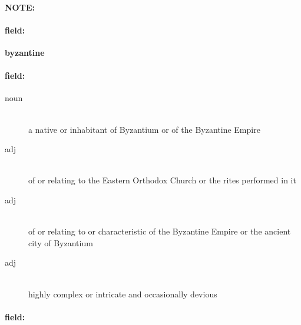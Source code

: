 \documentclass[12pt]{article}
\newenvironment{note}{\paragraph{NOTE:}}{}
\newenvironment{field}{\paragraph{field:}}{}
\begin{document}
\begin{note}
\begin{field}
\textbf{\large byzantine}
\end{field}


\begin{field}
\begin{description}
\item[noun] \hfill \\ 
a native or inhabitant of Byzantium or of the Byzantine Empire

\item[adj] \hfill \\ 
of or relating to the Eastern Orthodox Church or the rites performed in it

\item[adj] \hfill \\ 
of or relating to or characteristic of the Byzantine Empire or the ancient city of Byzantium

\item[adj] \hfill \\ 
highly complex or intricate and occasionally devious

\end{description}
\end{field}

\begin{field}
\end{field}
\end{note}
\end{document}
